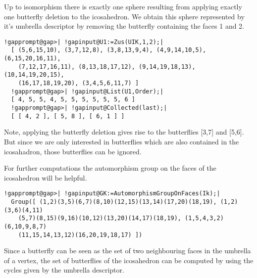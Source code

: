 \documentclass[a4paper,11pt]{report}
\begin{document}
{{ 
\begin{center}

\end{center}
 

 Up to isomorphism there is exactly one sphere resulting from applying exactly
one butterfly deletion to the icosahedron. We obtain this sphere represented
by it's umbrella descriptor by removing the butterfly containing the faces 1
and 2. 

 
\begin{Verbatim}[commandchars=!@|,fontsize=\small,frame=single,label=Example]
  !gapprompt@gap>| !gapinput@U1:=Zus(UIK,1,2);|
  [ (5,6,15,10), (3,7,12,8), (3,8,13,9,4), (4,9,14,10,5), (6,15,20,16,11), 
    (7,12,17,16,11), (8,13,18,17,12), (9,14,19,18,13), (10,14,19,20,15), 
    (16,17,18,19,20), (3,4,5,6,11,7) ]
  !gapprompt@gap>| !gapinput@List(U1,Order);|
  [ 4, 5, 5, 4, 5, 5, 5, 5, 5, 5, 6 ]
  !gapprompt@gap>| !gapinput@Collected(last);|
  [ [ 4, 2 ], [ 5, 8 ], [ 6, 1 ] ]
\end{Verbatim}
 

 Note, applying the butterfly deletion gives rise to the butterflies [3,7] and
[5,6]. But since we are only interested in butterflies which are also
contained in the icosahadron, those butterflies can be ignored. 

 
\begin{center}

\end{center}
 

 For further computations the automorphism group on the faces of the
icosahedron will be helpful. 

 
\begin{Verbatim}[commandchars=!@|,fontsize=\small,frame=single,label=Example]
  !gapprompt@gap>| !gapinput@GK:=AutomorphismGroupOnFaces(Ik);|
  Group([ (1,2)(3,5)(6,7)(8,10)(12,15)(13,14)(17,20)(18,19), (1,2)(3,6)(4,11)
    (5,7)(8,15)(9,16)(10,12)(13,20)(14,17)(18,19), (1,5,4,3,2)(6,10,9,8,7)
    (11,15,14,13,12)(16,20,19,18,17) ])
\end{Verbatim}
 

 Since a butterfly can be seen as the set of two neighbouring faces in the
umbrella of a vertex, the set of butterflies of the icosahedron can be
computed by using the cycles given by the umbrella descriptor. 

}}
\end{document}
